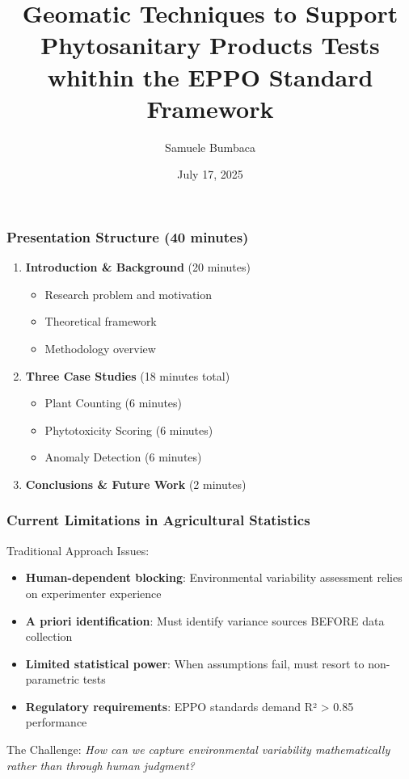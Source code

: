 \documentclass[aspectratio=43]{beamer}
\title{Geomatic Techniques to Support Phytosanitary Products Tests whithin the EPPO Standard Framework}
\author{Samuele Bumbaca}
\institute{University of Turin}
\date{July 17, 2025}
\begin{document}
\begin{frame}
    \titlepage
\end{frame}

\begin{frame}
    \frametitle{Presentation Structure (40 minutes)}
    
    \begin{enumerate}
        \item \textbf{Introduction \& Background} (20 minutes)
        \begin{itemize}
            \item Research problem and motivation
            \item Theoretical framework  
            \item Methodology overview
        \end{itemize}
        
        \item \textbf{Three Case Studies} (18 minutes total)
        \begin{itemize}
            \item Plant Counting (6 minutes)
            \item Phytotoxicity Scoring (6 minutes)
            \item Anomaly Detection (6 minutes)
        \end{itemize}
        
        \item \textbf{Conclusions \& Future Work} (2 minutes)
    \end{enumerate}
\end{frame}

\begin{frame}
    \frametitle{Current Limitations in Agricultural Statistics}
    
    \begin{block}{Traditional Approach Issues:}
        \begin{itemize}
            \item \textbf{Human-dependent blocking}: Environmental variability assessment relies on experimenter experience
            \item \textbf{A priori identification}: Must identify variance sources BEFORE data collection
            \item \textbf{Limited statistical power}: When assumptions fail, must resort to non-parametric tests
            \item \textbf{Regulatory requirements}: EPPO standards demand R² > 0.85 performance
        \end{itemize}
    \end{block}
    
    \begin{alertblock}{The Challenge:}
        \textit{How can we capture environmental variability mathematically rather than through human judgment?}
    \end{alertblock}
\end{frame}
\end{document}
